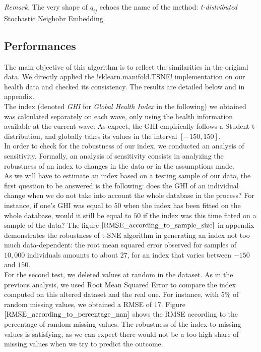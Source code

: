 \documentclass[]{article}
\begin{document}
\noindent
\textit{Remark.} The very shape of $q_{ij}$ echoes the name of the method: \textit{t-distributed} Stochastic Neighobr Embedding.

\subsection{Performances}
The main objective of this algorithm is to reflect the similarities in the original data. We directly applied the \pyth!sklearn.manifold.TSNE! implementation on our health data and checked its consistency. The results are detailed below and in appendix.\\

\noindent
The index (denoted \textit{GHI} for \textit{Global Health Index} in the following) we obtained was calculated separately on each wave, only using the health information available at the current wave. As expect, the GHI empirically follows a Student t-distribution, and globally takes its values in the interval $[-150, 150]$.\\

\noindent
In order to check for the robustness of our index, we conducted an analysis of sensitivity. Formally, an analysis of sensitivity consists in analyzing the robustness of an index to changes in the data or in the assumptions made.\\
As we will have to estimate an index based on a testing sample of our data, the first question to be answered is the following: does the GHI of an individual change when we do not take into account the whole database in the process? For instance, if one's GHI was equal to $50$ when the index has been fitted on the whole database, would it still be equal to $50$ if the index was this time fitted on a sample of the data? The figure $\ref{RMSE_according_to_sample_size}$ in appendix demonstrates the robustness of t-SNE algorithm in generating an index not too much data-dependent: the root mean squared error observed for samples of $10,000$ individuals amounts to about $27$, for an index that varies between $-150$ and $150$.\\
For the second test, we deleted values at random in the dataset. As in the previous analysis, we used Root Mean Squared Error to compare the index computed on this altered dataset and the real one. For instance, with $5\%$ of random missing values, we obtained a RMSE of $17$. Figure $\ref{RMSE_according_to_percentage_nan}$ shows the RMSE according to the percentage of random missing values. The robustness of the index to missing values is satisfying, as we can expect there would not be a too high share of missing values when we try to predict the outcome.\\
\end{document}
